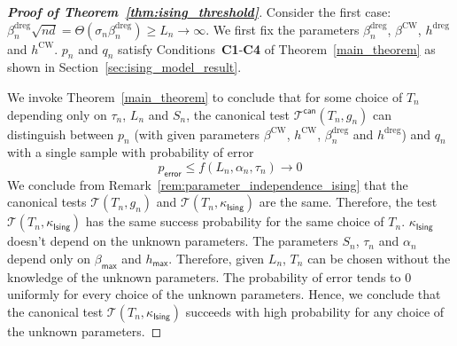 \documentclass[final,12pt]{colt2018}
\begin{document}
\begin{proof}[\textbf{Proof of Theorem~\ref{thm:ising_threshold}}]
Consider the first case: $\beta^{\mathrm{dreg}}_n \sqrt{nd} = \Theta(\sigma_n \beta^{\mathrm{dreg}}_n) \geq  L_n \to \infty $. We first fix the parameters $\beta^{\mathrm{dreg}}_n$, $\beta^{\mathrm{CW}}$, $h^{\mathrm{dreg}}$ and $h^{\mathrm{CW}}$. $p_n$ and $q_n$ satisfy  Conditions~\textbf{C1}-\textbf{C4} of Theorem~\ref{main_theorem} as shown in Section~\ref{sec:ising_model_result}. 

We invoke  Theorem~\ref{main_theorem} to conclude that for some choice of $T_n$ depending only on $\tau_n$, $L_n$ and $S_n$, the canonical test $\mathcal{T}^{\mathsf{can}}(T_n,g_n)$ can distinguish between $p_n$ (with given parameters $\beta^{\mathrm{CW}}$, $h^{\mathrm{CW}}$, $\beta^{\mathrm{dreg}}_n$ and $h^{\mathrm{dreg}}$) and $q_n$ with a single sample with probability of error 
$$p_{\mathsf{error}} \leq f(L_n,\alpha_n, \tau_n) \to 0$$
We conclude from Remark~\ref{rem:parameter_independence_ising} that the canonical tests $\mathcal{T}(T_n,g_n)$ and $\mathcal{T}(T_n,\kappa_{\mathsf{Ising}})$ are the same. Therefore, the test $\mathcal{T}(T_n,\kappa_{\mathsf{Ising}})$ has the same success probability for the same choice of $T_n$. $\kappa_{\mathsf{Ising}}$ doesn't depend on the unknown parameters. The parameters $S_n$, $\tau_n$ and $\alpha_n$ depend only on $\beta_{\mathsf{max}}$ and $h_{\mathsf{max}}$. Therefore, given $L_n$, $T_n$ can be chosen without the knowledge of the unknown parameters. The probability of error tends to $0$ uniformly for every choice of the unknown parameters. Hence, we conclude that the canonical test $\mathcal{T}(T_n,\kappa_{\mathsf{Ising}})$ succeeds with high probability for any choice of the unknown parameters.



\end{proof}
\end{document}
